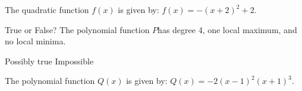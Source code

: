 \documentclass[11pt,answers]{exam}
\begin{document}
\begin{questions}


\addpoints

\question The quadratic function $f(x)$ is given by: $\displaystyle f(x) = -(x+2)^2+2$. 


\question[1] True or False? The polynomial function $P$has degree 4, one local maximum, and no local minima.
\begin{oneparchoices}
	\choice Possibly true \choice Impossible
\end{oneparchoices}

\question The polynomial function $Q(x)$ is given by: 
$\displaystyle Q(x) =-2 (x-1)^2(x+1)^3$.

\end{questions}
\end{document}
